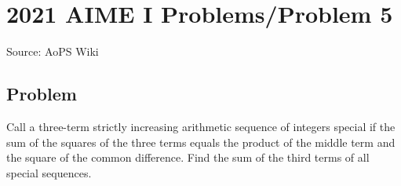 \documentclass[12pt]{article}
\begin{document}
\section*{{2021 AIME I Problems/Problem 5}}
Source: AoPS Wiki

\subsection*{Problem}
Call a three-term strictly increasing arithmetic sequence of integers special if the sum of the squares of the three terms equals the product of the middle term and the square of the common difference. Find the sum of the third terms of all special sequences.
\end{document}
